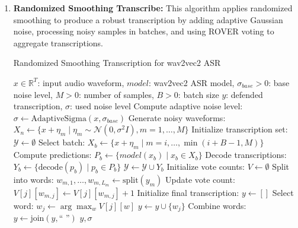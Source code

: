 \documentclass[../main.tex]{subfiles}
\begin{document}
\begin{enumerate}
\item \textbf{Randomized Smoothing Transcribe:} This algorithm applies randomized smoothing to produce a robust transcription by adding adaptive Gaussian noise, processing noisy samples in batches, and using ROVER voting to aggregate transcriptions.
\begin{breakablealgorithm}{Randomized Smoothing Transcription for wav2vec2 ASR}
\begin{algorithmic}[1]
\Require $x \in \mathbb{R}^T$: input audio waveform, $model$: wav2vec2 ASR model, $\sigma_{base} > 0$: base noise level, $M > 0$: number of samples, $B > 0$: batch size
\Ensure $y$: defended transcription, $\sigma$: used noise level
\State Compute adaptive noise level: $\sigma \gets \text{AdaptiveSigma}(x, \sigma_{base})$ 
\State Generate noisy waveforms: $X_n \gets \{ x + \eta_m \mid \eta_m \sim \mathcal{N}(0, \sigma^2 I), m = 1, \dots, M \}$ 
\State Initialize transcription set: $\mathcal{Y} \gets \emptyset$
 
    \State Select batch: $X_b \gets \{ x + \eta_m \mid m = i, \dots, \min(i+B-1, M) \}$
    \State Compute predictions: $P_b \gets \{ model(x_b) \mid x_b \in X_b \}$ 
    \State Decode transcriptions: $Y_b \gets \{ \text{decode}(p_b) \mid p_b \in P_b \}$ 
    \State $\mathcal{Y} \gets \mathcal{Y} \cup Y_b$
\EndFor
\State Initialize vote counts: $V \gets \emptyset$ 
    \State Split into words: $w_{m,1}, \dots, w_{m,L_m} \gets \text{split}(y_m)$
            \State Update vote count: $V[j][w_{m,j}] \gets V[j][w_{m,j}] + 1$ 
        \EndIf
    \EndFor
\EndFor
\State Initialize final transcription: $y \gets []$
        \State Select word: $w_j \gets \arg\max_w V[j][w]$ 
        \State $y \gets y \cup \{ w_j \}$
    \EndIf
\EndFor
\State Combine words: $y \gets \text{join}(y, \text{`` ''})$ 
\State \Return $y, \sigma$ 
\end{algorithmic}
\end{breakablealgorithm}
\end{enumerate}
\end{document}
